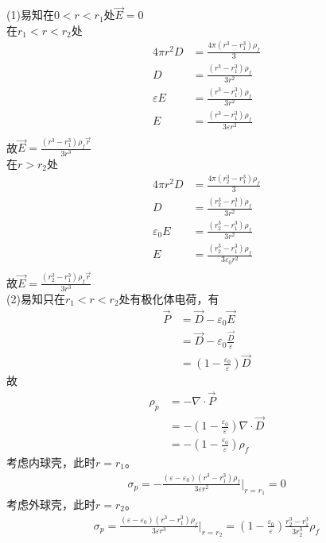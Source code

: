 \documentclass{phyasgn}
\begin{document}
\begin{sol}[1]
  (1)易知在$0<r<r_1$处$\vec{E}=0$\\
  在$r_1<r<r_2$处
  \begin{align*}
    4\pi r^2 D&=\frac{4\pi(r^3-r_1^3)\rho_f}{3}\\
    D&=\frac{(r^3-r_1^3)\rho_f}{3r^2}\\
    \varepsilon E&=\frac{(r^3-r_1^3)\rho_f}{3r^2}\\
    E&=\frac{(r^3-r_1^3)\rho_f}{3\varepsilon r^2}\\
  \end{align*}
  故$\vec{E}=\frac{(r^3-r_1^3)\rho_f\vec{r}}{3r^3}$\\
  在$r>r_2$处
  \begin{align*}
    4\pi r^2 D&=\frac{4\pi(r_2^3-r_1^3)\rho_f}{3}\\
    D&=\frac{(r_2^3-r_1^3)\rho_f}{3r^2}\\
    \varepsilon_0 E&=\frac{(r_2^3-r_1^3)\rho_f}{3r^2}\\
    E&=\frac{(r_2^3-r_1^3)\rho_f}{3\varepsilon_0r^2}\\
  \end{align*}
  故$\vec{E}=\frac{(r_2^3-r_1^3)\rho_f\vec{r}}{3r^3}$\\
  (2)易知只在$r_1<r<r_2$处有极化体电荷，有
  \begin{align*}
    \vec{P}&=\vec{D}-\varepsilon_0\vec{E}\\
    &=\vec{D}-\varepsilon_0\frac{\vec{D}}{\varepsilon}\\
    &=(1-\frac{\varepsilon_0}{\varepsilon})\vec{D}
  \end{align*}
  故
  \begin{align*}
    \rho_p&=-\nabla\cdot\vec{P}\\
    &=-(1-\frac{\varepsilon_0}{\varepsilon})\nabla\cdot\vec{D}\\
    &=-(1-\frac{\varepsilon_0}{\varepsilon})\rho_f
  \end{align*}
  考虑内球壳，此时$r=r_1$。
  \begin{align*}
    \sigma_p=-\frac{(\varepsilon-\varepsilon_0)(r^3-r_1^3)\rho_f}{3\varepsilon r^2}|_{r=r_1}=0
  \end{align*}
  考虑外球壳，此时$r=r_2$。
  \begin{align*}
    \sigma_p=\frac{(\varepsilon-\varepsilon_0)(r^3-r_1^3)\rho_f}{3\varepsilon r^3}|_{r=r_2}=(1-\frac{\varepsilon_0}{\varepsilon})\frac{r_2^3-r_1^3}{3r^3_2}\rho_f
  \end{align*}
\end{sol}\par
\end{document}
